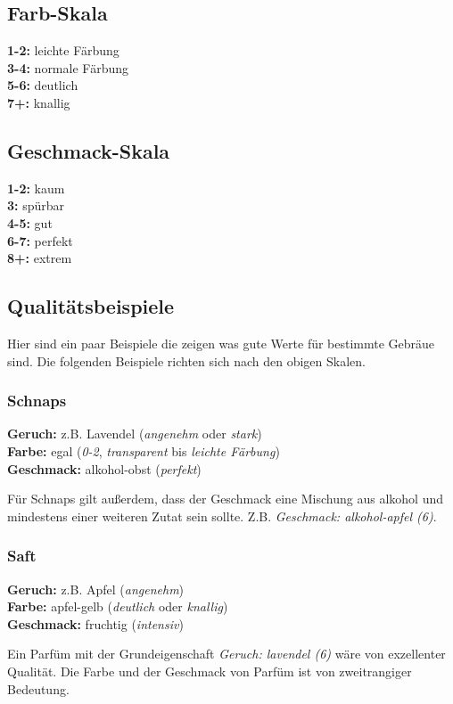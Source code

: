 \subsection{Farb-Skala}
\textbf{1-2:} leichte Färbung \\
\textbf{3-4:} normale Färbung \\
\textbf{5-6:} deutlich \\
\textbf{7+:} knallig

\subsection{Geschmack-Skala}
\textbf{1-2:} kaum \\
\textbf{3:} spürbar \\
\textbf{4-5:} gut \\
\textbf{6-7:} perfekt \\
\textbf{8+:} extrem

\subsection{Qualitätsbeispiele}
Hier sind ein paar Beispiele die zeigen was gute Werte für bestimmte Gebräue sind. Die folgenden Beispiele richten sich nach den obigen Skalen.

\subsubsection{Schnaps}
\textbf{Geruch:} z.B. Lavendel (\textit{angenehm} oder \textit{stark}) \\
\textbf{Farbe:} egal (\textit{0-2}, \textit{transparent} bis \textit{leichte Färbung}) \\
\textbf{Geschmack:} alkohol-obst (\textit{perfekt})

Für Schnaps gilt außerdem, dass der Geschmack eine Mischung aus alkohol und mindestens einer weiteren Zutat sein sollte. Z.B. \textit{Geschmack: alkohol-apfel (6)}.

\subsubsection{Saft}
\textbf{Geruch:} z.B. Apfel (\textit{angenehm}) \\
\textbf{Farbe:} apfel-gelb (\textit{deutlich} oder \textit{knallig}) \\
\textbf{Geschmack:} fruchtig (\textit{intensiv})

Ein Parfüm mit der Grundeigenschaft \textit{Geruch: lavendel (6)} wäre von exzellenter Qualität. Die Farbe und der Geschmack von Parfüm ist von zweitrangiger Bedeutung.
